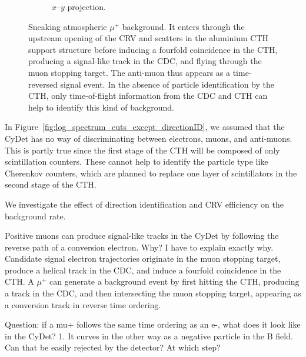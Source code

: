 \begin{figure}
\begin{subfigure}{0.43\textwidth}
        \caption{$x$--$y$ projection.}
    \end{subfigure}
    \caption{ Sneaking atmospheric $\mu^+$ background. It enters through the
        upstream opening of the CRV and scatters in the aluminium CTH support
        structure before inducing a fourfold coincidence in the CTH, producing a
        signal-like track in the CDC, and flying through the muon stopping
        target. The anti-muon thus appears as a time-reversed signal event. In
        the absence of particle identification by the CTH, only time-of-flight
        information from the CDC and CTH can help to identify this kind of
        background. }
    \label{fig:cosmic_antimuon_bg_in_cydet}
\end{figure}

In Figure~\ref{fig:log_spectrum_cuts_except_directionID}, we assumed that the
CyDet has no way of discriminating between electrons, muons, and anti-muons.
This is partly true since the first stage of the CTH will be composed of only
scintillation counters. These cannot help to identify the particle type like
Cherenkov counters, which are planned to replace one layer of scintillators in
the second stage of the CTH. 

We investigate the effect of direction identification and CRV efficiency on the
background rate.

Positive muons can produce signal-like tracks in the CyDet by following the
reverse path of a conversion electron. Why? I have to explain exactly why.
Candidate signal electron trajectories originate in the muon stopping target,
produce a helical track in the CDC, and induce a fourfold coincidence in the
CTH. A $\mu^+$ can generate a background event by first hitting the CTH,
producing a track in the CDC, and then intersecting the muon stopping target,
appearing as a conversion track in reverse time ordering.

Question: if a mu+ follows the same time ordering as an e-, what does it look
like in the CyDet? 1. It curves in the other way as a negative particle in the B
field. Can that be easily rejected by the detector? At which step?

